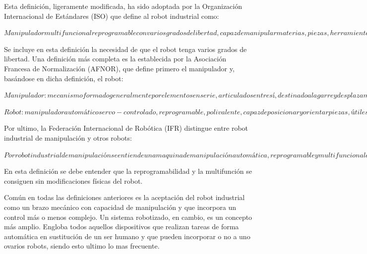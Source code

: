 \documentclass[12pt,a4paper]{report}
\begin{document}
Esta definición, ligeramente modificada, ha sido adoptada por la Organización
Internacional de Estándares (ISO) que define al robot industrial como:

$Manipulador multifuncional reprogramable con varios grados de libertad, capaz de
manipular materias, piezas, herramientas o dispositivos especiales según
trayectorias variables programadas para realizar tareas diversas.$

Se incluye en esta definición la necesidad de que el robot tenga varios grados
de libertad. Una definición más completa es la establecida por la Asociación
Francesa de Normalización (AFNOR), que define primero el manipulador y,
basándose en dicha definición, el robot:

$Manipulador: mecanismo formado generalmente por elementos en serie, articulados
entre sí, destinado al agarre y desplazamiento de objetos. Es multifuncional y
puede ser gobernado directamente por un operador humano o mediante dispositivo
lógico.$

$Robot: manipulador automático servo-controlado, reprogramable, polivalente,
capaz de posicionar y orientar piezas, útiles o dispositivos especiales,
siguiendo trayectoria variables reprogramables, para la ejecución de tareas
variadas. Normalmente tiene la forma de uno o varios brazos terminados en una
muñeca. Su unidad de control incluye un dispositivo de memoria y ocasionalmente
de percepción del entorno. Normalmente su uso es el de realizar una tarea de
manera cíclica, pudiéndose adaptar a otra sin cambios permanentes en su
material.$

Por ultimo, la Federación Internacional de Robótica (IFR) distingue entre robot
industrial de manipulación y otros robots:

$Por robot industrial de manipulación se entiende una maquina de manipulación
automática, reprogramable y multifuncional con tres o más ejes que pueden
posicionar y orientar materias, piezas, herramientas o dispositivos especiales
para la ejecución de trabajos diversos en las diferentes etapas de la producción
industrial, ya sea en una posición fija o en movimiento.$

En esta definición se debe entender que la reprogramabilidad y la multifunción
se consiguen sin modificaciones físicas del robot.

Común en todas las definiciones anteriores es la aceptación del robot industrial
como un brazo mecánico con capacidad de manipulación y que incorpora un control
más o menos complejo. Un sistema robotizado, en cambio, es un concepto más
amplio. Engloba todos aquellos dispositivos que realizan tareas de forma
automática en sustitución de un ser humano y que pueden incorporar o no a uno
ovarios robots, siendo esto ultimo lo mas frecuente.
\end{document}
